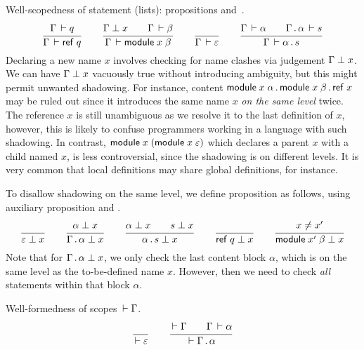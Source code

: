 \documentclass{article}
\theoremstyle{definition}
\theoremstyle{plain}
\theoremstyle{remark}
\begin{document}
Well-scopedness of statement (lists): propositions
  and
\fbox{$\WContent \Gamma \alpha$}\,.
\begin{gather*}
  \ru{\Declares \Gamma q}{\WContent \Gamma {\mref q}}
\qquad
  \ru{\NoClash \Gamma x \qquad \WContent \Gamma \beta
    }{\WContent \Gamma {\mdef x \beta}
    }
\qquad
  \ru{}{\WContent \Gamma \Ge}
\qquad
  \ru{\WContent \Gamma \alpha \qquad
      \WContent {\Gamma \sep \alpha} s
    }{\WContent \Gamma {\alpha \sep s}
    }
\end{gather*}
Declaring a new name $x$ involves checking for name clashes via judgement
$\Gamma \perp x$.  We can have $\Gamma \perp x$ vacuously true
without introducing ambiguity, but this might permit unwanted
shadowing.
For instance, content $\mathsf{module}\;x\;\alpha \,.\, \mathsf{module}\;x\;\beta \,.\, \mathsf{ref}\;x$ may be ruled out
since it introduces the same name $x$ \emph{on the same level} twice.
The reference $x$ is still unambiguous as we resolve it to the last
definition of $x$, however, this is likely to confuse programmers
working in a language with such shadowing.
In contrast, $\mathsf{module}\;x\;(\mathsf{module}\;x\;\varepsilon)$ which declares a
parent $x$ with a child named $x$, is less controversial, since the
shadowing is on different levels.  It is very common that local
definitions may share global definitions, for instance.

To disallow shadowing on the same level, we define proposition
 as follows, using auxiliary proposition
 and
.
\begin{gather*}
  \ru{}{\NoClash \Ge x}
\qquad
  \ru{\NoClash \alpha x
    }{\NoClash {\Gamma \sep \alpha} x}
\qquad
  \ru{\NoClash \alpha x \qquad \NoClash s x
    }{\NoClash {\alpha \sep s} x}
\qquad
  \ru{}{\NoClash {\mref q} x}
\qquad
  \ru{x \not= x'
    }{\NoClash {\mdef {x'} \beta} x}
\end{gather*}
Note that for $\Gamma \,.\, \alpha \perp x$,
we only check the last content block $\alpha$,
which is on the same level as the to-be-defined name $x$.
However, then we need to check \emph{all} statements within that block
$\alpha$.

Well-formedness of scopes $\,\vdash\Gamma$.
\begin{gather*}
  \ru{}{\WScope \Ge}
\qquad
  \ru{\WScope \Gamma \qquad \WContent \Gamma \alpha
    }{\WScope {\Gamma \sep \alpha}}
\end{gather*}

\end{document}
